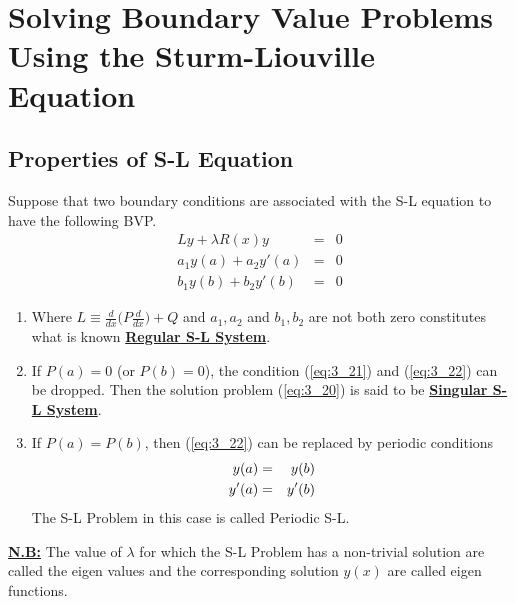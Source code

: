\documentclass[12pt]{report}
\newcommand{\ubt}[1]{\textbf{\underline{#1}}}
\newcommand{\refn}[1]{(\ref{#1})}
\newcommand{\refx}[1]{\refn{eq:#1}}
\newcommand{\dsp}{\displaystyle}
\newcommand{\sprime}{'}
\begin{document}
	
	\section{Solving Boundary Value Problems Using the Sturm-Liouville Equation}
	\subsection{Properties of S-L Equation}
	Suppose that two boundary conditions are associated with the S-L equation to have the following BVP.
	\begin{eqnarray}
		Ly + \lambda R(x)y~~~~ &=& 0 \label{eq:3_20}\\
		a_1y(a) + a_2y\sprime(a) &=& 0 \label{eq:3_21}\\
		b_1y(b) + b_2y\sprime(b)~ &=& 0 \label{eq:3_22}
	\end{eqnarray}

	\begin{enumerate}
		\item Where $\dsp L \equiv \frac{d}{dx}\Big(P\frac{d}{dx}\Big) + Q$ and $a_1, a_2$ and $b_1, b_2$ are not both zero constitutes what is known \ubt{Regular S-L System}.
		
		\item If $P(a) = 0$ (or $P(b) = 0$), the condition \refx{3_21} and \refx{3_22} can be dropped. Then the solution problem \refx{3_20} is said to be \ubt{Singular S-L System}.
		
		\item If $P(a) = P(b)$, then \refx{3_22} can be replaced by periodic conditions
		\begin{eqnarray}
			y(a) &=& y(b)\notag\\
			y\sprime(a) &=& y\sprime(b)\notag
		\end{eqnarray}
		The S-L Problem in this case is called Periodic S-L.
	\end{enumerate}
	\ubt{N.B:} The value of $\lambda$ for which the S-L Problem has a non-trivial solution are called the eigen values and the corresponding solution $y(x)$ are called eigen functions. 
	
	
\end{document}
